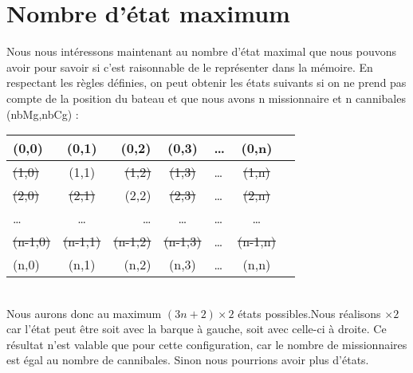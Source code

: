 \documentclass[a4paper, 12pt, french,oneside]{book}
\begin{document}
\section{Nombre d'état maximum}
Nous nous intéressons maintenant au nombre d'état maximal que nous pouvons avoir pour savoir si c'est raisonnable de le représenter dans la mémoire. En respectant les règles définies, on peut obtenir les états suivants si on ne prend pas compte de la position du bateau et que nous avons n missionnaire et n cannibales (nbMg,nbCg) : \\
\begin{tabular}{|l|c|r|c|l|c|r|}
    \hline
    (0,0)          & (0,1) & (0,2)          & (0,3) & \dots & (0,n) \\
    \hline
    \sout{(1,0)}   &
    (1,1)          &
    \sout{(1,2)}   &
    \sout{(1,3)}   & \dots &
    \sout{(1,n)}                                                    \\
    \hline
    \sout{(2,0)}   &
    \sout{(2,1)}   &
    (2,2)          &
    \sout{(2,3)}   & \dots &
    \sout{(2,n)}                                                    \\
    \hline
    \dots          & \dots & \dots          & \dots & \dots & \dots \\
    \hline
    \sout{(n-1,0)} &
    \sout{(n-1,1)} &
    \sout{(n-1,2)} &
    \sout{(n-1,3)} & \dots & \sout{(n-1,n)}                         \\
    \hline
    (n,0)          &
    (n,1)          &
    (n,2)          &
    (n,3)          & \dots & (n,n)                                  \\
    \hline
\end{tabular} \\
Nous aurons donc au maximum $(3n+2)\times2$ états possibles.Nous réalisons $\times 2$ car l'état peut être soit avec la barque à gauche, soit avec celle-ci à droite. Ce résultat n'est valable que pour cette configuration, car le nombre de missionnaires est égal au nombre de cannibales. Sinon nous pourrions avoir plus d'états.
\end{document}
